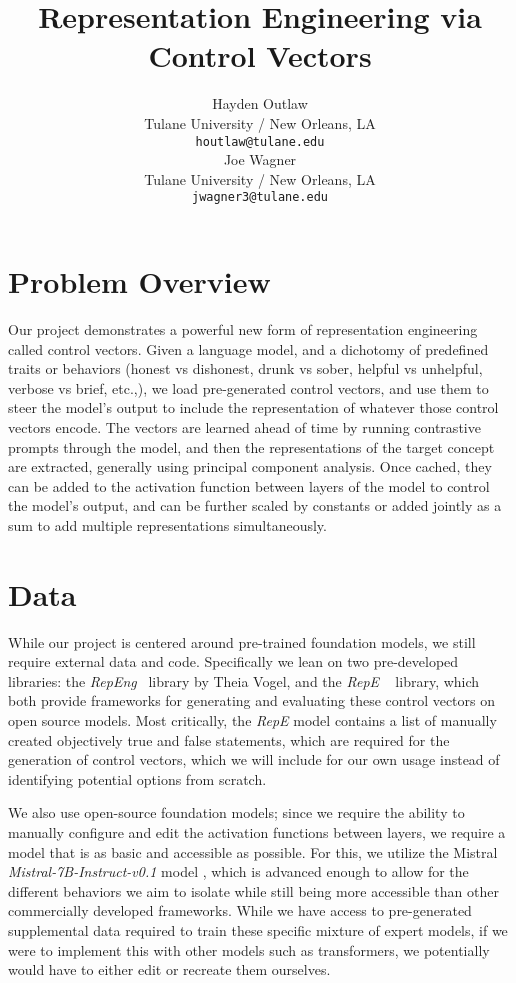 \documentclass[11pt,a4paper]{article}
\title{Representation Engineering via Control Vectors}
\author{Hayden Outlaw \\
  Tulane University / New Orleans, LA \\
  \texttt{houtlaw@tulane.edu} \\\And
  Joe Wagner \\
  Tulane University / New Orleans, LA \\
  \texttt{jwagner3@tulane.edu} \\}
\date{}
\begin{document}
\maketitle



\section{Problem Overview}

Our project demonstrates a powerful new form of representation engineering called control vectors. Given a language model, and a dichotomy of predefined traits or behaviors (honest vs dishonest, drunk vs sober, helpful vs unhelpful, verbose vs brief, etc.,), we load pre-generated control vectors, and use them to steer the model's output to include the representation of whatever those control vectors encode. The vectors are learned ahead of time by running contrastive prompts through the model, and then the representations of the target concept are extracted, generally using principal component analysis. Once cached, they can be added to the activation function between layers of the model to control the model's output, and can be further scaled by constants or added jointly as a sum to add multiple representations simultaneously.


\section{Data}
While our project is centered around pre-trained foundation models, we still require external data and code. Specifically we lean on two pre-developed libraries: the \emph{RepEng}~\cite{vogel2024repeng} library by Theia Vogel, and the \emph{RepE} ~\cite{zou2023representation} library, which both provide frameworks for generating and evaluating these control vectors on open source models. Most critically, the \emph{RepE} model contains a list of manually created objectively true and false statements, which are required for the generation of control vectors, which we will include for our own usage instead of identifying potential options from scratch.

We also use open-source foundation models; since we require the ability to manually configure and edit the activation functions between layers, we require a model that is as basic and accessible as possible. For this, we utilize the Mistral \emph{Mistral-7B-Instruct-v0.1} model \cite{jiang2023mistral}, which is advanced enough to allow for the different behaviors we aim to isolate while still being more accessible than other commercially developed frameworks. While we have access to pre-generated supplemental data required to train these specific mixture of expert models, if we were to implement this with other models such as transformers, we potentially would have to either edit or recreate them ourselves.
\end{document}

